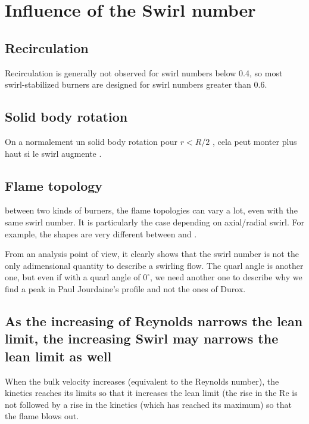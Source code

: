 \section{Influence of the Swirl number}

\subsection{Recirculation}

Recirculation is generally not observed for swirl numbers below 0.4, so most swirl-stabilized burners are designed for swirl numbers greater than 0.6.

\subsection{Solid body rotation}

On a normalement un solid body rotation pour $r<R/2$ \cite{toh_axial_2010} , cela peut monter plus haut si le swirl augmente \cite{durox_flame_2013}.

\subsection{Flame topology}

between two kinds of burners, the flame topologies can vary a lot, even with the same swirl number. It is particularly the case depending on axial/radial swirl. For example, the shapes are very different between \cite{paul_jourdaine_nom_effect_2016} and \cite{durox_flame_2013}.

From an analysis point of view, it clearly shows that the swirl number is not the only adimensional quantity to describe a swirling flow. The quarl angle is another one, but even if with a quarl angle of $0^\circ$, we need another one to describe why we find a peak in Paul Jourdaine's profile and not the ones of Durox.

\subsection{As the increasing of Reynolds narrows the lean limit, the increasing Swirl may narrows the lean limit as well}

When the bulk velocity increases (equivalent to the Reynolds number), the kinetics reaches its limits so that it increases the lean limit (the rise in the Re is not followed by a rise in the kinetics (which has reached its maximum) so that the flame blows out.

